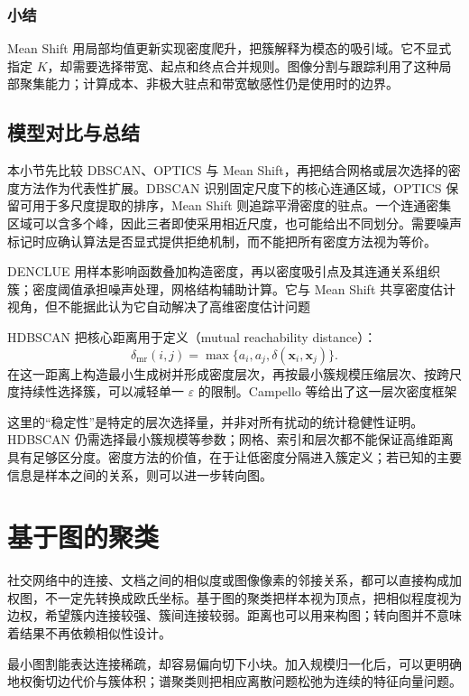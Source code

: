 \subsubsection{小结}

Mean Shift 用局部均值更新实现密度爬升，把簇解释为模态的吸引域。它不显式指定 $K$，却需要选择带宽、起点和终点合并规则。图像分割与跟踪利用了这种局部聚集能力；计算成本、非极大驻点和带宽敏感性仍是使用时的边界。

\subsection{模型对比与总结}

本小节先比较 DBSCAN、OPTICS 与 Mean Shift，再把结合网格或层次选择的密度方法作为代表性扩展。DBSCAN 识别固定尺度下的核心连通区域，OPTICS 保留可用于多尺度提取的排序，Mean Shift 则追踪平滑密度的驻点。一个连通密集区域可以含多个峰，因此三者即使采用相近尺度，也可能给出不同划分。需要噪声标记时应确认算法是否显式提供拒绝机制，而不能把所有密度方法视为等价。

DENCLUE 用样本影响函数叠加构造密度，再以密度吸引点及其连通关系组织簇；密度阈值承担噪声处理，网格结构辅助计算。它与 Mean Shift 共享密度估计视角，但不能据此认为它自动解决了高维密度估计问题

HDBSCAN 把核心距离用于定义（mutual reachability distance）：
\[
 \delta_{\mathrm{mr}}(i,j)
 =\max\{a_i,a_j,\delta(\bm{x}_i,\bm{x}_j)\}.
\]
在这一距离上构造最小生成树并形成密度层次，再按最小簇规模压缩层次、按跨尺度持续性选择簇，可以减轻单一 $\varepsilon$ 的限制。Campello 等给出了这一层次密度框架

这里的“稳定性”是特定的层次选择量，并非对所有扰动的统计稳健性证明。HDBSCAN 仍需选择最小簇规模等参数；网格、索引和层次都不能保证高维距离具有足够区分度。密度方法的价值，在于让低密度分隔进入簇定义；若已知的主要信息是样本之间的关系，则可以进一步转向图。

\section{基于图的聚类}
\label{sec:clustering-graph}

社交网络中的连接、文档之间的相似度或图像像素的邻接关系，都可以直接构成加权图，不一定先转换成欧氏坐标。基于图的聚类把样本视为顶点，把相似程度视为边权，希望簇内连接较强、簇间连接较弱。距离也可以用来构图；转向图并不意味着结果不再依赖相似性设计。

最小图割能表达连接稀疏，却容易偏向切下小块。加入规模归一化后，可以更明确地权衡切边代价与簇体积；谱聚类则把相应离散问题松弛为连续的特征向量问题。

